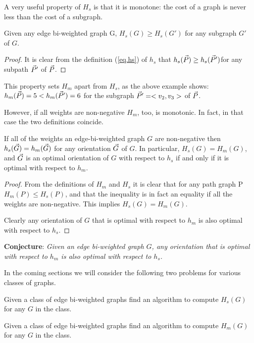 A very useful property of $H_s$ is that it is monotone: the cost of a graph is never less than the cost of a subgraph.
\begin{lemma}\label{lem:sprop}
	Given any edge bi-weighted graph G,
	$H_{s}(G)\geq  H_{s}(G')$ for any subgraph $G'$ of $G$. 
\end{lemma}

\begin{proof}
It is clear from the definition (\ref{eq.hs}) of $h_s$ that $h_s(\vec{P})\geq h_s(\vec{P} ')$for any subpath 
$\vec{P} '$ of $\vec{P}$.  
\end{proof}

This property sets $H_m$ apart from $H_s$,  as the above example shows:
$h_{m}(\vec{P})=5 <  h_{m}(\vec{P}')=6$ for the subgraph $\vec{P} '=<v_2,v_3>$ of $\vec{P}$.

However, if all weights are non-negative $H_m$, too, is monotonic. In fact, in that case the two definitions coincide.

\begin{lemma}
	If all of the weights an edge-bi-weighted graph $G$ are non-negative 
	then $h_{s}( \vec{G} )= h_{m}( \vec{G} )$ for any orientation $\vec{G}$ of $G$.
	In particular,  $H_{s}(G)= H_{m}(G)$,  and 
	$\vec{G}$ is an optimal orientation of $G$ with respect to $h_{s}$
	if and only if it is optimal with respect to $ h_{m} $.
\end{lemma}
\begin{proof}
From the definitions of $H_m$ and $H_s$ it is clear that for any path graph P  $H_{m}(P)\leq  H_{s}(P)$, and that the inequality is in fact an equality if all the weights 
are non-negative. This implies $H_{s}(G)= H_{m}(G)$.

Clearly any orientation of $G$ that is optimal with respect to $h_m$ is also 
optimal with respect to $h_s$. 
\end{proof}

\bigskip
{\bf Conjecture}:
\textit{Given an edge bi-weighted graph $G$, any orientation that is optimal with 
	respect to $h_{m}$ is also optimal with respect to $h_{s} $.}

\bigskip
In the coming sections we will consider the following two problems
for various classes of graphs.

\begin{problem}[
	HS]
	Given a class of edge bi-weighted graphs find an algorithm to compute
	$H_s(G) $
	for any $G$
	in the class.
\end{problem}

\begin{problem}[
	HM]
	Given a class of edge bi-weighted graphs find an algorithm to compute $H_m(G) $
	for any $G$
	in the class.
\end{problem}
